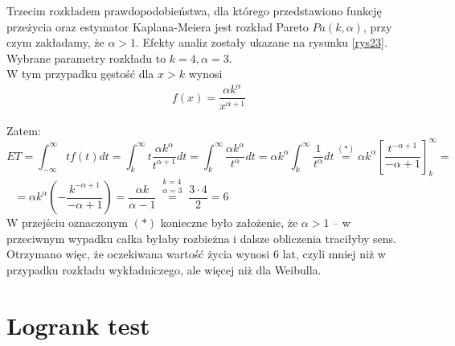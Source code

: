 \documentclass[licencjacka]{pwr_wmat_praca_dyplomowa}
\theoremstyle{plain}
\numberwithin{theorem}{chapter}
\theoremstyle{definition}
\numberwithin{theorem}{chapter}
\begin{document}
Trzecim rozkładem prawdopodobieństwa, dla którego przedstawiono funkcję przeżycia oraz  estymator Kaplana-Meiera jest rozkład Pareto $Pa(k,\alpha)$, przy czym zakładamy, że $\alpha>1$. Efekty analiz zostały ukazane na rysunku \ref{rys23}. Wybrane parametry rozkładu to $k=4, \alpha=3$. \\ W tym przypadku gęstość dla $x>k$ wynosi
\begin{align}
f(x) = \dfrac{\alpha k^\alpha}{x^{\alpha+1}} 
\end{align}

\noindent Zatem:
$$ ET=\int^{\infty}_{-\infty} tf(t)dt=
\int^{\infty}_{k} t\dfrac{\alpha k^\alpha}{t^{\alpha+1}}dt=
\int^{\infty}_{k}\dfrac{\alpha k^\alpha}{t^{\alpha}}dt=
\alpha k^\alpha \int^{\infty}_{k}\dfrac{1}{t^{\alpha}}dt \overset{(\ast)}{=}
\alpha k^\alpha \left[\dfrac{t^{-\alpha+1}}{-\alpha+1}\right]^\infty_k=
$$
$
 \ \ \ = \alpha k^\alpha\left(-\dfrac{k^{-\alpha+1}}{-\alpha+1}\right)=
\dfrac{\alpha k}{\alpha-1}\overset{\substack{k=4 \\ \alpha=3}}{=}
\dfrac{3 \cdot 4}{2}=6
$ \\
W przejściu oznaczonym $(\ast)$ konieczne było założenie, że $\alpha>1$ -- w przeciwnym wypadku całka byłaby rozbieżna i dalsze obliczenia traciłyby sens. Otrzymano więc, że oczekiwana wartość życia wynosi 6 lat, czyli mniej niż w przypadku rozkładu wykładniczego, ale więcej niż dla Weibulla.







 
 
 
 
 
 
 
\section{Logrank test}
\end{document}

